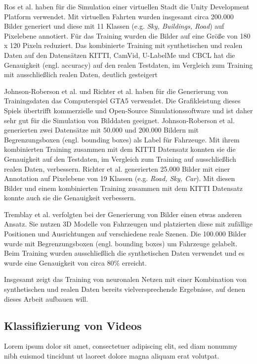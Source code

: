 Ros et al. \cite{ros2016synthia} haben für die Simulation einer virtuellen Stadt die Unity Development Platform verwendet. Mit virtuellen Fahrten wurden insgesamt circa 200.000 Bilder generiert und diese mit 11 Klassen (e.g. \textit{Sky, Buildings, Road}) auf Pixelebene annotiert. Für das Training wurden die Bilder auf eine Größe von 180 x 120 Pixeln reduziert. Das kombinierte Training mit synthetischen und realen Daten auf den Datensätzen KITTI, CamVid, U-LabelMe und CBCL hat die Genauigkeit (engl. accuracy) auf den realen Testdaten, im Vergleich zum Training mit ausschließlich realen Daten, deutlich gesteigert

Johnson-Roberson et al. \cite{johnson2017driving} und Richter et al. \cite{richter2016playing} haben für die Generierung von Trainingsdaten das Computerspiel GTA5 verwendet. Die Grafikleistung dieses Spiels übertrifft kommerzielle und Open-Source Simulationssoftware und ist daher sehr gut für die Simulation von Bilddaten geeignet. Johnson-Roberson et al. \cite{johnson2017driving} generierten zwei Datensätze mit 50.000 und 200.000 Bildern mit Begrenzungsboxen (engl. bounding boxes) als Label für Fahrzeuge. Mit ihrem kombinierten Training zusammen mit dem KITTI Datensatz konnten sie die Genauigkeit auf den Testdaten, im Vergleich zum Training auf ausschließlich realen Daten, verbessern. Richter et al. \cite{richter2016playing} generierten 25.000 Bilder mit einer Annotation auf Pixelebene von 19 Klassen (e.g. \textit{Road, Sky, Car}). Mit diesen Bilder und einem kombinierten Training zusammen mit dem KITTI Datensatz konnte auch sie die Genauigkeit verbessern.

Tremblay et al. \cite{tremblay2018training} verfolgten bei der Generierung von Bilder einen etwas anderen Ansatz. Sie nutzen 3D Modelle von Fahrzeugen und platzierten diese mit zufällige Positionen und Ausrichtungen auf verschiedene reale Szenen. Die 100.000 Bilder wurde mit Begrenzungsboxen (engl. bounding boxes) um Fahrzeuge gelabelt. Beim Training wurden ausschließlich die synthetischen Daten verwendet und es wurde eine Genauigkeit von circa 80\% erreicht.

Insgesamt zeigt das Training von neuronalen Netzen mit einer Kombination von synthetischen und realen Daten bereits vielversprechende Ergebnisse, auf denen dieses Arbeit aufbauen will.


\subsection{Klassifizierung von Videos}
\label{grundlagen_nn_video}

Lorem ipsum dolor sit amet, consectetuer adipiscing elit, sed diam nonummy nibh euismod tincidunt ut laoreet dolore magna aliquam erat volutpat. 



